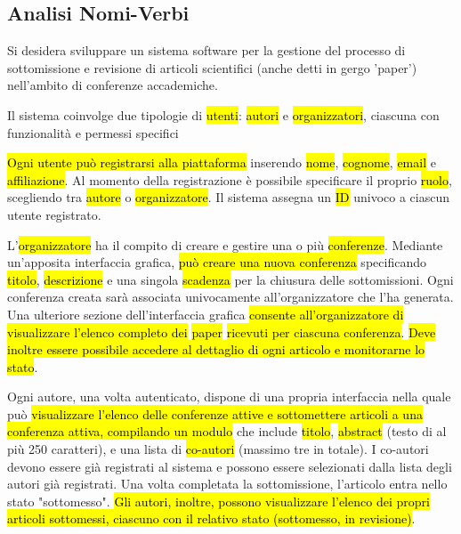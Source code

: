 \subsection{Analisi Nomi-Verbi}
\label{sec:analisi_nomi_verbi}
Si desidera sviluppare un sistema software per la gestione del
processo di sottomissione e revisione di articoli scientifici (anche
detti in gergo 'paper') nell’ambito di conferenze accademiche.
\bigskip

Il sistema coinvolge due tipologie di
\hl{utenti}:
\hl{autori} e
\hl{organizzatori}, ciascuna con funzionalità e
permessi specifici
\bigskip

\hl{Ogni utente può registrarsi alla
  piattaforma} inserendo \hl{nome},
\hl{cognome},
\hl{email} e
\hl{affiliazione}. Al momento della
registrazione è possibile specificare il proprio
\hl{ruolo}, scegliendo tra
\hl{autore} o
\hl{organizzatore}. Il sistema assegna un
\hl{ID} univoco a ciascun utente registrato.
\bigskip

L'\hl{organizzatore} ha il compito di creare e
gestire una o più \hl{conferenze}. Mediante
un’apposita interfaccia grafica, \hl{può creare
  una nuova conferenza} specificando
\hl{titolo},
\hl{descrizione} e una singola
\hl{scadenza} per la chiusura delle
sottomissioni. Ogni conferenza creata sarà associata univocamente
all’organizzatore che l’ha generata. Una ulteriore sezione
dell'interfaccia grafica \hl{consente
  all'organizzatore di visualizzare l’elenco completo dei}
\hl{paper} \hl{ricevuti per
  ciascuna conferenza}. \hl{Deve inoltre essere
  possibile accedere al dettaglio di ogni articolo e monitorarne lo
  stato}.  \bigskip

Ogni autore, una volta autenticato, dispone di una propria interfaccia
nella quale può \hl{visualizzare l'elenco delle
  conferenze attive e sottomettere articoli a una conferenza attiva,
  compilando un modulo} che include
\hl{titolo},
\hl{abstract} (testo di al più 250 caratteri),
e una lista di \hl{co-autori} (massimo tre in
totale). I co-autori devono essere già registrati al sistema e possono
essere selezionati dalla lista degli autori già registrati. Una volta
completata la sottomissione, l'articolo entra nello stato
"sottomesso". \hl{Gli autori, inoltre, possono
  visualizzare l'elenco dei propri articoli sottomessi, ciascuno con
  il relativo stato (sottomesso, in revisione)}.  \bigskip

